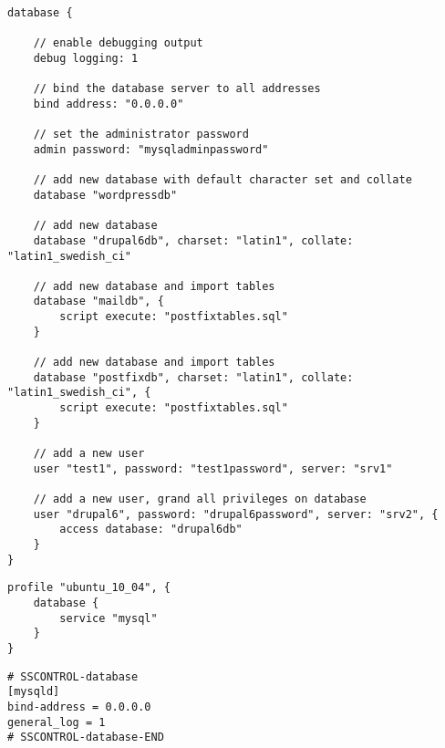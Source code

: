
\begin{lstlisting}[style=Java,label=lst:database_example_script,
title={Example script for a database. It will set the database server address, create four databases and two users.}]
database {

    // enable debugging output
    debug logging: 1

    // bind the database server to all addresses
    bind address: "0.0.0.0"

    // set the administrator password
    admin password: "mysqladminpassword"

    // add new database with default character set and collate
    database "wordpressdb"

    // add new database
    database "drupal6db", charset: "latin1", collate: "latin1_swedish_ci"

    // add new database and import tables
    database "maildb", {
        script execute: "postfixtables.sql"
    }

    // add new database and import tables
    database "postfixdb", charset: "latin1", collate: "latin1_swedish_ci", {
        script execute: "postfixtables.sql"
    }

    // add a new user
    user "test1", password: "test1password", server: "srv1"

    // add a new user, grand all privileges on database
    user "drupal6", password: "drupal6password", server: "srv2", {
        access database: "drupal6db"
    }
}
\end{lstlisting}

\begin{lstlisting}[style=Java,label=lst:database_ubuntu_profile_min,
title={Minimal Ubuntu database profile, only the database type is needed. The other profile properties are set to default values.}]
profile "ubuntu_10_04", {
    database {
        service "mysql"
    }
}
\end{lstlisting}

\begin{lstlisting}[style=rcfile_nonumbers,
label=lst:database_maincf_example,
title={Example MySQL server configuration file that is created from the database profile.
The file is saved as /etc/mysql/conf.d/sscontrol\_mysqld.cnf}]
# SSCONTROL-database
[mysqld]
bind-address = 0.0.0.0
general_log = 1
# SSCONTROL-database-END
\end{lstlisting}

